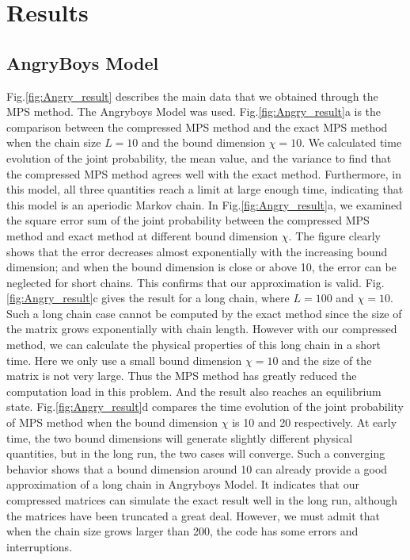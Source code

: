\section{Results}
\subsection{AngryBoys Model}
    Fig.\ref{fig:Angry_result} describes the main data that we obtained through the MPS method. The Angryboys Model was used. Fig.\ref{fig:Angry_result}a is the comparison between the compressed MPS method and the exact MPS method when the chain size $L=10$ and the bound dimension $\chi=10$. We calculated time evolution of the joint probability, the mean value, and the variance to find that the compressed MPS method agrees well with the exact method. Furthermore, in this model, all three quantities reach a limit at large enough time, indicating that this model is an aperiodic Markov chain. In Fig.\ref{fig:Angry_result}a, we examined the square error sum of the joint probability between the compressed MPS method and exact method at different bound dimension $\chi$. The figure clearly shows that the error decreases almost exponentially with the increasing bound dimension; and when the bound dimension is close or above 10, the error can be neglected for short chains. This confirms that our approximation is valid. Fig.\ref{fig:Angry_result}c gives the result for a long chain, where $L=100$ and $\chi=10$. Such a long chain case cannot be computed by the exact method since the size of the matrix grows exponentially with chain length. However with our compressed method, we can calculate the physical properties of this long chain in a short time. Here we only use a small bound dimension $\chi=10$ and the size of the matrix is not very large. Thus the MPS method has greatly reduced the computation load in this problem. And the result also reaches an equilibrium state. Fig.\ref{fig:Angry_result}d compares the time evolution of the joint probability of MPS method when the bound dimension $\chi$ is 10 and 20 respectively. At early time, the two bound dimensions will generate slightly different physical quantities, but in the long run, the two cases will converge. Such a converging behavior shows that a bound dimension around 10 can already provide a good approximation of a long chain in Angryboys Model. It indicates that our compressed matrices can simulate the exact result well in the long run, although the matrices have been truncated a great deal. However, we must admit that when the chain size grows larger than 200, the code has some errors and interruptions.
    
